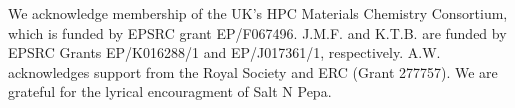 \documentclass[journal=jacsat,manuscript=communication]{achemso}
\begin{document}
\begin{acknowledgement}
We acknowledge membership of the UK's HPC Materials Chemistry Consortium, which is funded by EPSRC grant EP/F067496. 
J.M.F. and K.T.B. are funded by EPSRC Grants EP/K016288/1 and EP/J017361/1, respectively.
A.W. acknowledges support from the Royal Society and ERC (Grant 277757). 
We are grateful for the lyrical encouragment of Salt N Pepa. 
\end{acknowledgement}



\end{document}
